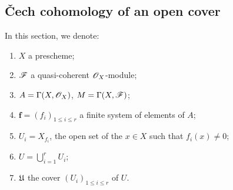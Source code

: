 \subsection{\v Cech cohomology of an open cover}
\label{subsection:cech-cohomology-open-cover}

\begin{nota}[1.2.1]
\label{3.1.2.1}
In this section, we denote:
\begin{enumerate}[label=--]
  \item $X$ a prescheme;
  \item $\mathscr{F}$ a quasi-coherent $\mathscr{O}_X$-module;
  \item $A=\Gamma(X,\mathscr{O}_X)$, $M=\Gamma(X,\mathscr{F})$;
  \item $\mathbf{f}=(f_i)_{1\leq i\leq r}$ a finite system of elements of $A$;
  \item $U_i=X_{f_i}$, the open set  of the $x\in X$ such that $f_i(x)\neq 0$;
  \item $U=\bigcup_{i=1}^r U_i$;
  \item $\mathfrak{U}$ the cover $(U_i)_{1\leq i\leq r}$ of $U$.
\end{enumerate}
\end{nota}

